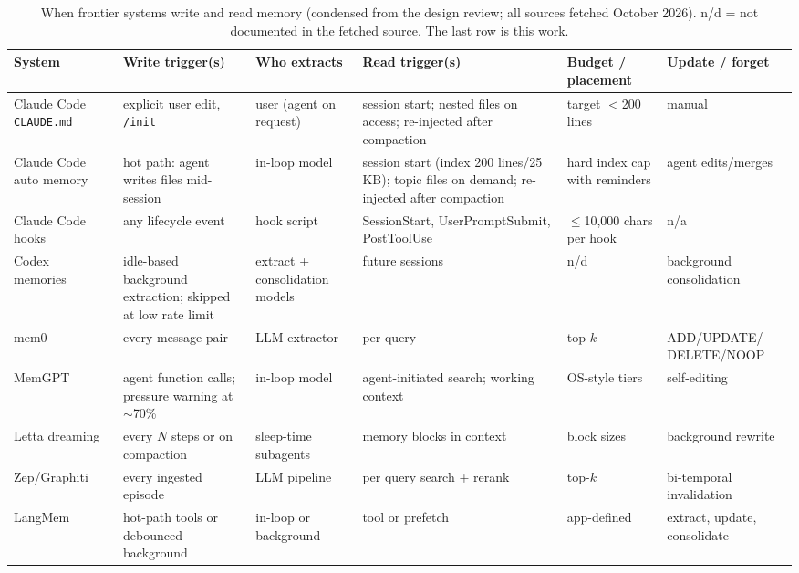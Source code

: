 \documentclass[10pt,twocolumn]{article}
\newcommand{\code}[1]{\texttt{\small #1}}
\begin{document}
\begin{table}[t]
\centering\scriptsize
\caption{When frontier systems write and read memory (condensed from the design review; all sources fetched October 2026).
n/d = not documented in the fetched source. The last row is this work.}
\label{tab:survey}
\setlength{\tabcolsep}{3.5pt}
\begin{tabularx}{\textwidth}{@{}l>{\raggedright\arraybackslash}X>{\raggedright\arraybackslash}p{2.3cm}>{\raggedright\arraybackslash}X>{\raggedright\arraybackslash}p{2.9cm}>{\raggedright\arraybackslash}p{2.6cm}@{}}
\toprule
System & Write trigger(s) & Who extracts & Read trigger(s) & Budget / placement & Update / forget \\
\midrule
Claude Code \code{CLAUDE.md}~\cite{ccmemory} & explicit user edit, \code{/init} & user (agent on request) & session start; nested files on access; re-injected after compaction & target $<$200 lines & manual \\
Claude Code auto memory~\cite{ccmemory} & hot path: agent writes files mid-session & in-loop model & session start (index 200 lines/25\,KB); topic files on demand; re-injected after compaction & hard index cap with reminders & agent edits/merges \\
Claude Code hooks~\cite{cchooks} & any lifecycle event & hook script & SessionStart, UserPromptSubmit, PostToolUse & $\le$10,000 chars per hook & n/a \\
Codex memories~\cite{codexmemories} & idle-based background extraction; skipped at low rate limit & extract + consolidation models & future sessions & n/d & background consolidation \\
mem0~\cite{mem0} & every message pair & LLM extractor & per query & top-$k$ & ADD/UPDATE/ DELETE/NOOP \\
MemGPT~\cite{memgpt} & agent function calls; pressure warning at $\sim$70\% & in-loop model & agent-initiated search; working context & OS-style tiers & self-editing \\
Letta dreaming~\cite{lettadocs} & every $N$ steps or on compaction & sleep-time subagents & memory blocks in context & block sizes & background rewrite \\
Zep/Graphiti~\cite{zep} & every ingested episode & LLM pipeline & per query search + rerank & top-$k$ & bi-temporal invalidation \\
LangMem~\cite{langmem} & hot-path tools or debounced background & in-loop or background & tool or prefetch & app-defined & extract, update, consolidate \\

\end{tabularx}
\end{table}
\end{document}
